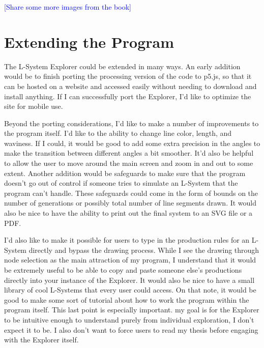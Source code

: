 \documentclass[12pt,twoside]{reedthesis}
\begin{document}
	\textcolor{blue}{[Share some more images from the book]}
	
\section{Extending the Program}

	The L-System Explorer could be extended in many ways. An early addition would be to finish porting the processing version of the code to p5.js, so that it can be hosted on a website and accessed easily without needing to download and install anything. If I can successfully port the Explorer, I'd like to optimize the site for mobile use.
	
	Beyond the porting considerations, I'd like to make a number of improvements to the program itself. I'd like to the ability to change line color, length, and waviness. If I could, it would be good to add some extra precision in the angles to make the transition between different angles a bit smoother. It'd also be helpful to allow the user to move around the main screen and zoom in and out to some extent. Another addition would be safeguards to make sure that the program doesn't go out of control if someone tries to simulate an L-System that the program can't handle. These safeguards could come in the form of bounds on the number of generations or possibly total number of line segments drawn. It would also be nice to have the ability to print out the final system to an SVG file or a PDF. 
	
	I'd also like to make it possible for users to type in the production rules for an L-System directly and bypass the drawing process. While I see the drawing through node selection as the main attraction of my program, I understand that it would be extremely useful to be able to copy and paste someone else's productions directly into your instance of the Explorer. It would also be nice to have a small library of cool L-Systems that every user could access. On that note, it would be good to make some sort of tutorial about how to work the program within the program itself. This last point is especially important.  my goal is for the Explorer to be intuitive enough to understand purely from individual exploration, I don't expect it to be. I also don't want to force users to read my thesis before engaging with the Explorer itself.
	
\end{document}
